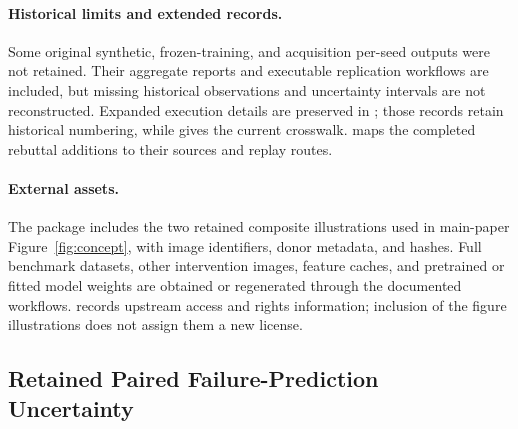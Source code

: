 \paragraph{Historical limits and extended records.}
Some original synthetic, frozen-training, and acquisition per-seed outputs were not retained. Their aggregate reports and executable replication workflows are included, but missing historical observations and uncertainty intervals are not reconstructed. Expanded execution details are preserved in ; those records retain historical numbering, while  gives the current crosswalk.  maps the completed rebuttal additions to their sources and replay routes.

\paragraph{External assets.}
The package includes the two retained composite illustrations used in main-paper Figure~\ref{fig:concept}, with image identifiers, donor metadata, and hashes. Full benchmark datasets, other intervention images, feature caches, and pretrained or fitted model weights are obtained or regenerated through the documented workflows.  records upstream access and rights information; inclusion of the figure illustrations does not assign them a new license.

\FloatBarrier
\subsection{Retained Paired Failure-Prediction Uncertainty}
\label{app:supplement-flip-uncertainty}

